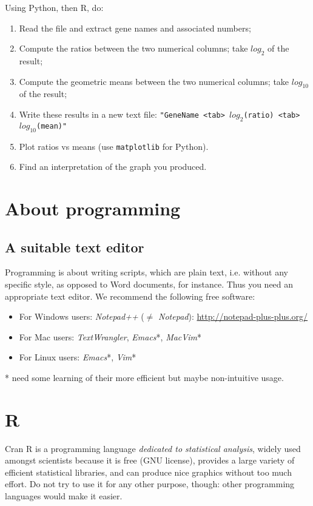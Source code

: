 \documentclass[a4paper,11pt]{article}
\begin{document}
Using Python, then R, do:
\begin{enumerate}
\item Read the file and extract gene names and associated numbers;
\item Compute the ratios between the two numerical columns; take $log_{2}$ of the result;
\item Compute the geometric means between the two numerical columns; take $log_{10}$ of the result;
\item Write these results in a new text file: \texttt{"GeneName <tab> $log_2$(ratio) <tab> $log_{10}$(mean)"}
\item Plot ratios vs means (use  \texttt{matplotlib} for Python).
\item Find an interpretation of the graph you produced.
\end{enumerate}

\clearpage

\section{About programming}
\subsection{A suitable text editor}
Programming is about writing scripts, which are plain text, i.e. without any specific style, as opposed to Word documents, for instance. Thus you need an appropriate text editor. We recommend the following free software:

\begin{itemize}
\item For Windows users: {\it Notepad++} ($\ne$ {\it Notepad}): \url{http://notepad-plus-plus.org/}
\item For Mac users: {\it TextWrangler}, {\it Emacs}*, {\it MacVim}*
\item For Linux users: {\it Emacs}*, {\it Vim}*
\end{itemize}
* need some learning of their more efficient but maybe non-intuitive usage.

\section{R}
Cran R is a programming language {\it dedicated to statistical analysis}, widely used amongst scientists
because it is free (GNU license), provides a large variety of efficient statistical libraries, and can produce 
nice graphics without too much effort. Do not try to use it for any other purpose, though: other programming languages 
would make it easier.
\end{document}
